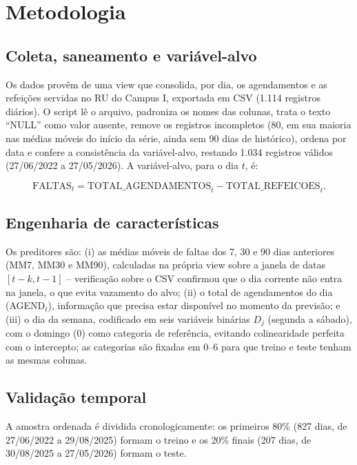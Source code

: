 \documentclass[11pt]{article}
\begin{document}
\section{Metodologia}

\subsection{Coleta, saneamento e variável-alvo}

Os dados provêm de uma view que consolida, por dia, os agendamentos e as refeições servidas no RU do Campus I, exportada em CSV (1.114 registros diários). O script lê o arquivo, padroniza os nomes das colunas, trata o texto ``NULL'' como valor ausente, remove os registros incompletos (80, em sua maioria nas médias móveis do início da série, ainda sem 90 dias de histórico), ordena por data e confere a consistência da variável-alvo, restando 1.034 registros válidos (27/06/2022 a 27/05/2026). A variável-alvo, para o dia $t$, é:

\begin{equation}
\text{FALTAS}_t = \text{TOTAL\_AGENDAMENTOS}_t - \text{TOTAL\_REFEICOES}_t.
\label{eq:faltas}
\end{equation}

\subsection{Engenharia de características}

Os preditores são: (i) as médias móveis de faltas dos 7, 30 e 90 dias anteriores (MM7, MM30 e MM90), calculadas na própria view sobre a janela de datas $[t-k,t-1]$ -- verificação sobre o CSV confirmou que o dia corrente não entra na janela, o que evita vazamento do alvo; (ii) o total de agendamentos do dia (AGEND$_t$), informação que precisa estar disponível no momento da previsão; e (iii) o dia da semana, codificado em seis variáveis binárias $D_j$ (segunda a sábado), com o domingo (0) como categoria de referência, evitando colinearidade perfeita com o intercepto; as categorias são fixadas em 0--6 para que treino e teste tenham as mesmas colunas.

\subsection{Validação temporal}

A amostra ordenada é dividida cronologicamente: os primeiros 80\% (827 dias, de 27/06/2022 a 29/08/2025) formam o treino e os 20\% finais (207 dias, de 30/08/2025 a 27/05/2026) formam o teste.
\end{document}
